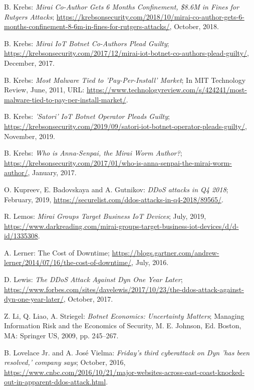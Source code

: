 \begin{thebibliography}{99}
 B. Krebs: \emph{Mirai Co-Author Gets 6 Months Confinement, \$8.6M in Fines for Rutgers Attacks}; \url{https://krebsonsecurity.com/2018/10/mirai-co-author-gets-6-months-confinement-8-6m-in-fines-for-rutgers-attacks/}, October, 2018.

 B. Krebs: \emph{Mirai IoT Botnet Co-Authors Plead Guilty}; \url{https://krebsonsecurity.com/2017/12/mirai-iot-botnet-co-authors-plead-guilty/}, December, 2017.

 B. Krebs: \emph{Most Malware Tied to 'Pay-Per-Install' Market}; In MIT Technology Review, June, 2011, URL: \url{https://www.technologyreview.com/s/424241/most-malware-tied-to-pay-per-install-market/}.

 B. Krebs: \emph{'Satori' IoT Botnet Operator Pleads Guilty}; \url{https://krebsonsecurity.com/2019/09/satori-iot-botnet-operator-pleads-guilty/}, November, 2019.

 B. Krebs: \emph{Who is Anna-Senpai, the Mirai Worm Author?}; \url{https://krebsonsecurity.com/2017/01/who-is-anna-senpai-the-mirai-worm-author/}, January, 2017.

 O. Kupreev, E. Badovskaya and A. Gutnikov: \emph{DDoS attacks in Q4 2018}; February, 2019, \url{https://securelist.com/ddos-attacks-in-q4-2018/89565/}.

 R. Lemos: \emph{Mirai Groups Target Business IoT Devices}; July, 2019, \url{https://www.darkreading.com/mirai-groups-target-business-iot-devices/d/d-id/1335308}.

 A. Lerner: The Cost of Downtime; \url{https://blogs.gartner.com/andrew-lerner/2014/07/16/the-cost-of-downtime/}, July, 2016.

 D. Lewis: \emph{The DDoS Attack Against Dyn One Year Later}; \url{https://www.forbes.com/sites/davelewis/2017/10/23/the-ddos-attack-against-dyn-one-year-later/}, October, 2017.

 Z. Li, Q. Liao, A. Striegel:  \emph{Botnet Economics: Uncertainty Matters}; Managing Information Risk and the Economics of Security, M. E. Johnson, Ed. Boston, MA: Springer US, 2009, pp. 245--267.

 B. Lovelace Jr. and A. Jos\'{e} Vielma: \emph{Friday's third cyberattack on Dyn 'has been resolved,' company says}; October, 2016, \url{https://www.cnbc.com/2016/10/21/major-websites-across-east-coast-knocked-out-in-apparent-ddos-attack.html}.


\end{thebibliography}
